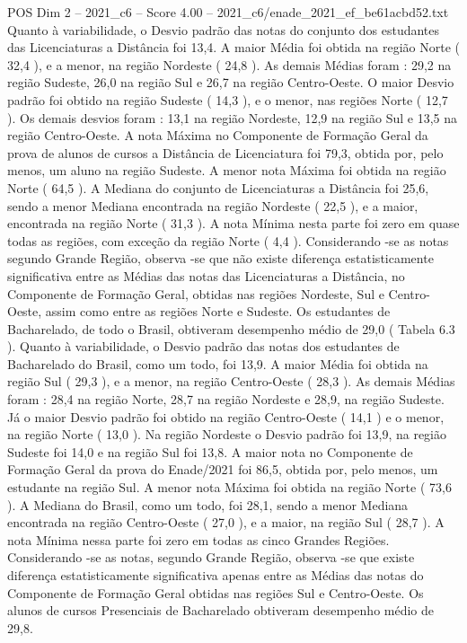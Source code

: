 \begin{textsample}{POS Dim 2 – 2021\_c6 – Score 4.00 – 2021\_c6/enade\_2021\_ef\_be61acbd52.txt}
Quanto à variabilidade, o Desvio padrão das notas do conjunto dos estudantes das Licenciaturas a Distância foi 13,4.
A maior Média foi obtida na região Norte ( 32,4 ), e a menor, na região Nordeste ( 24,8 ).
As demais Médias foram : 29,2 na região Sudeste, 26,0 na região Sul e 26,7 na região Centro-Oeste.
O maior Desvio padrão foi obtido na região Sudeste ( 14,3 ), e o menor, nas regiões Norte ( 12,7 ).
Os demais desvios foram : 13,1 na região Nordeste, 12,9 na região Sul e 13,5 na região Centro-Oeste.
A nota Máxima no Componente de Formação Geral da prova de alunos de cursos a Distância de Licenciatura foi 79,3, obtida por, pelo menos, um aluno na região Sudeste.
A menor nota Máxima foi obtida na região Norte ( 64,5 ).
A Mediana do conjunto de Licenciaturas a Distância foi 25,6, sendo a menor Mediana encontrada na região Nordeste ( 22,5 ), e a maior, encontrada na região Norte ( 31,3 ).
A nota Mínima nesta parte foi zero em quase todas as regiões, com exceção da região Norte ( 4,4 ).
Considerando -se as notas segundo Grande Região, observa -se que não existe diferença estatisticamente significativa entre as Médias das notas das Licenciaturas a Distância, no Componente de Formação Geral, obtidas nas regiões Nordeste, Sul e Centro-Oeste, assim como entre as regiões Norte e Sudeste.
Os estudantes de Bacharelado, de todo o Brasil, obtiveram desempenho médio de 29,0 ( Tabela 6.3 ).
Quanto à variabilidade, o Desvio padrão das notas dos estudantes de Bacharelado do Brasil, como um todo, foi 13,9.
A maior Média foi obtida na região Sul ( 29,3 ), e a menor, na região Centro-Oeste ( 28,3 ).
As demais Médias foram : 28,4 na região Norte, 28,7 na região Nordeste e 28,9, na região Sudeste.
Já o maior Desvio padrão foi obtido na região Centro-Oeste ( 14,1 ) e o menor, na região Norte ( 13,0 ).
Na região Nordeste o Desvio padrão foi 13,9, na região Sudeste foi 14,0 e na região Sul foi 13,8.
A maior nota no Componente de Formação Geral da prova do Enade/2021 foi 86,5, obtida por, pelo menos, um estudante na região Sul.
A menor nota Máxima foi obtida na região Norte ( 73,6 ).
A Mediana do Brasil, como um todo, foi 28,1, sendo a menor Mediana encontrada na região Centro-Oeste ( 27,0 ), e a maior, na região Sul ( 28,7 ).
A nota Mínima nessa parte foi zero em todas as cinco Grandes Regiões.
Considerando -se as notas, segundo Grande Região, observa -se que existe diferença estatisticamente significativa apenas entre as Médias das notas do Componente de Formação Geral obtidas nas regiões Sul e Centro-Oeste.
Os alunos de cursos Presenciais de Bacharelado obtiveram desempenho médio de 29,8.

\end{textsample}
